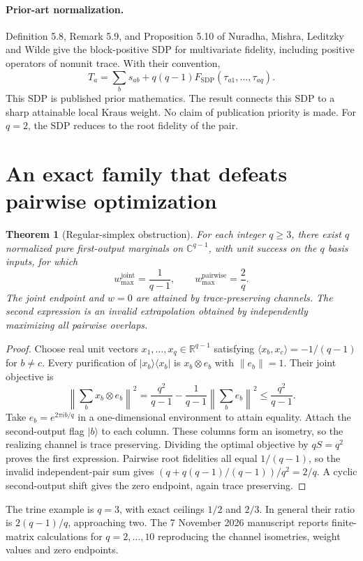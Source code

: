 \documentclass[10pt,letterpaper]{article}
\newtheorem{theorem}{Theorem}
\begin{document}
\paragraph{Prior-art normalization.} Definition 5.8, Remark 5.9, and Proposition 5.10 of Nuradha, Mishra, Leditzky and Wilde \cite{nuradha} give the block-positive SDP for multivariate fidelity, including positive operators of nonunit trace. With their convention,
\[
T_a=\sum_b s_{ab}+q(q-1)F_{\mathrm{SDP}}(\tau_{a1},\ldots,\tau_{aq}).
\]
This SDP is published prior mathematics. The result connects this SDP to a sharp attainable local Kraus weight. No claim of publication priority is made. For $q=2$, the SDP reduces to the root fidelity of the pair.

\section{An exact family that defeats pairwise optimization}
\begin{theorem}[Regular-simplex obstruction]
For each integer $q\ge3$, there exist $q$ normalized pure first-output marginals on $\mathbb C^{q-1}$, with unit success on the $q$ basis inputs, for which
\[
\boxed{w_{\max}^{\mathrm{joint}}=\frac1{q-1},\qquad w_{\max}^{\mathrm{pairwise}}=\frac2q.}
\]
The joint endpoint and $w=0$ are attained by trace-preserving channels. The second expression is an invalid extrapolation obtained by independently maximizing all pairwise overlaps.
\end{theorem}
\begin{proof}
Choose real unit vectors $x_1,\ldots,x_q\in\mathbb R^{q-1}$ satisfying $\langle x_b,x_c\rangle=-1/(q-1)$ for $b\ne c$. Every purification of $|x_b\rangle\langle x_b|$ is $x_b\otimes e_b$ with $\|e_b\|=1$. Their joint objective is
\[
\left\|\sum_b x_b\otimes e_b\right\|^2=\frac{q^2}{q-1}-\frac1{q-1}\left\|\sum_b e_b\right\|^2\le\frac{q^2}{q-1}.
\]
Take $e_b=e^{2\pi ib/q}$ in a one-dimensional environment to attain equality. Attach the second-output flag $|b\rangle$ to each column. These columns form an isometry, so the realizing channel is trace preserving. Dividing the optimal objective by $qS=q^2$ proves the first expression. Pairwise root fidelities all equal $1/(q-1)$, so the invalid independent-pair sum gives $(q+q(q-1)/(q-1))/q^2=2/q$. A cyclic second-output shift gives the zero endpoint, again trace preserving.
\end{proof}
The trine example is $q=3$, with exact ceilings $1/2$ and $2/3$. In general their ratio is $2(q-1)/q$, approaching two. The 7 November 2026 manuscript reports finite-matrix calculations for $q=2,\ldots,10$ reproducing the channel isometries, weight values and zero endpoints.
\end{document}
